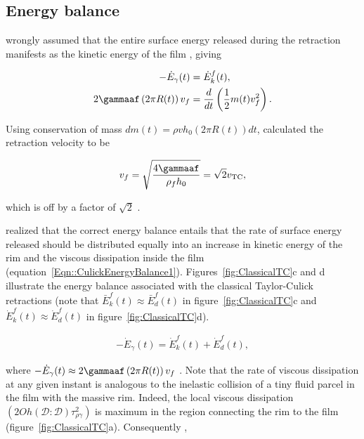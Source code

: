 \begin{subappendices}
	\subsection{Energy balance}
	\citet{dupre1867theorie, dupre1869theorie} wrongly assumed that the entire surface energy released during the retraction manifests as the kinetic energy of the film \citep{rayleigh-1891-nature}, giving
	
	\begin{align}
		-\dot{E}_\gamma(t) &= \dot{E}_k^f(t),\\
		2\gammaaf\left(2\pi R(t)\right)v_f &= \frac{d}{dt}\left(\frac{1}{2}m(t)v_f^2\right).
	\end{align}
	
	\noindent Using conservation of mass $dm(t) = \rho vh_0\left(2\pi R(t)\right)dt$, \citet{dupre1867theorie, dupre1869theorie} calculated the retraction velocity to be
	
	\begin{align}
		v_f = \sqrt{\frac{4\gammaaf}{\rho_f h_{0}}} = \sqrt{2}v_{\text{TC}},
	\end{align}
	
	\noindent which is off by a factor of $\sqrt{2}$ \citep[see Dupr{\'e}-Rayleigh paradox in][]{villermaux2020fragmentation}. 
	
	\citet{culick-1960-japplphys} realized that the correct energy balance entails that the rate of surface energy released should be distributed equally into an increase in kinetic energy of the rim and the viscous dissipation inside the film (equation~\eqref{Eqn::CulickEnergyBalance1}). Figures~\ref{fig:ClassicalTC}c and d illustrate the energy balance associated with the classical Taylor-Culick retractions (note that $\bar{E}_k^f(t) \approx \bar{E}_d^f(t)$ in figure~\ref{fig:ClassicalTC}c and $\dot{E}_k^f(t) \approx \dot{E}_d^f(t)$ in figure~\ref{fig:ClassicalTC}d). 
	
	\begin{align}
		\label{Eqn::CulickEnergyBalance1}
		-\dot{E}_\gamma(t) = \dot{E}_k^f(t) + \dot{E}_d^f(t),
	\end{align}
	
	\noindent where $-\dot{E}_\gamma (t) \approx 2\gammaaf\left(2\pi R(t)\right)v_f$ \citep[see appendix~\ref{App::EnergyBalance} and][]{bohr2021surface}. Note that the rate of viscous dissipation at any given instant is analogous to the inelastic collision of a tiny fluid parcel in the film with the massive rim. Indeed, the local viscous dissipation $\left(2Oh\left(\boldsymbol{\mathcal{D}:\mathcal{D}}\right)\tau_{\rho\gamma}^2\right)$ is maximum in the region connecting the rim to the film (figure~\ref{fig:ClassicalTC}a). Consequently \citep{culick-1960-japplphys},  
	

\end{subappendices}
